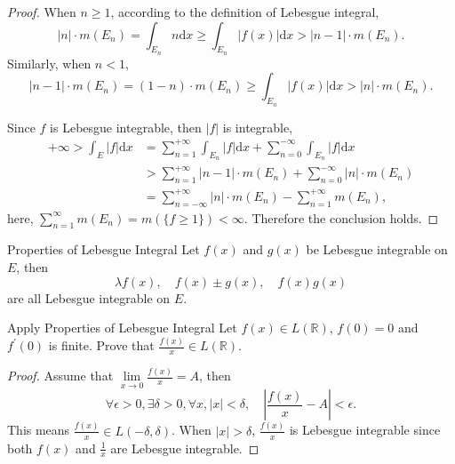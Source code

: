 \begin{proof}
  When $n \geq 1$, according to the definition of Lebesgue integral,
  \begin{equation}
    |n| \cdot m(E_n) = \int_{E_n} n \mathrm{d} x \geq \int_{E_n} |f(x)| \mathrm{d}x
    > |n-1| \cdot m(E_n).
  \end{equation}
  Similarly, when $n < 1$,
  \begin{equation}
    |n - 1| \cdot m(E_n) = (1-n) \cdot m(E_n) \geq \int_{E_n} |f(x)|\mathrm{d}x
    > |n|\cdot m(E_n).
  \end{equation}

  Since $f$ is Lebesgue integrable, then $|f|$ is integrable,
  \begin{align}
    +\infty > \int_E |f|\mathrm{d} x
    &= \sum\limits_{n = 1}^{+\infty} \int_{E_n} |f|\mathrm{d}x + \sum\limits_{n = 0}^{-\infty} \int_{E_n}|f|\mathrm{d}x\\
    &> \sum\limits_{n = 1}^{+\infty} |n-1| \cdot m(E_n)
    + \sum\limits_{n = 0}^{-\infty} |n| \cdot m(E_n)\\
    &= \sum\limits_{n = -\infty}^{+\infty} |n| \cdot m(E_n) - \sum\limits_{n = 1}^{+\infty} m(E_n),
  \end{align}
  here, $\sum\limits_{n = 1}^{\infty} m(E_n) = m(\{f \geq 1\}) < \infty$.
  Therefore the conclusion holds.
\end{proof}

\begin{proposition}{Properties of Lebesgue Integral}{}
  Let $f(x)$ and $g(x)$ be Lebesgue integrable on $E$, then
  \begin{equation}
    \lambda f(x), \quad f(x) \pm g(x), \quad f(x)g(x)
  \end{equation}
  are all Lebesgue integrable on $E$.
\end{proposition}

\begin{example}{Apply Properties of Lebesgue Integral}{}
  Let $f(x) \in L(\mathbb{R})$, $f(0) = 0$ and $f^{\prime}(0)$ is finite.
  Prove that $\frac{f(x)}{x} \in L(\mathbb{R})$.
\end{example}

\begin{proof}
  Assume that $\lim \limits _{x \rightarrow 0} \frac{f(x)}{x} = A$,
  then
  \begin{equation}
    \forall \epsilon > 0, \exists \delta > 0, \forall x, |x| < \delta,
    \quad |\frac{f(x)}{x} - A| < \epsilon.
  \end{equation}
  This means $\frac{f(x)}{x} \in L(-\delta, \delta)$.
  When $|x| > \delta$, $\frac{f(x)}{x}$ is Lebesgue integrable since both $f(x)$ and $\frac{1}{x}$ are Lebesgue integrable.
\end{proof}

